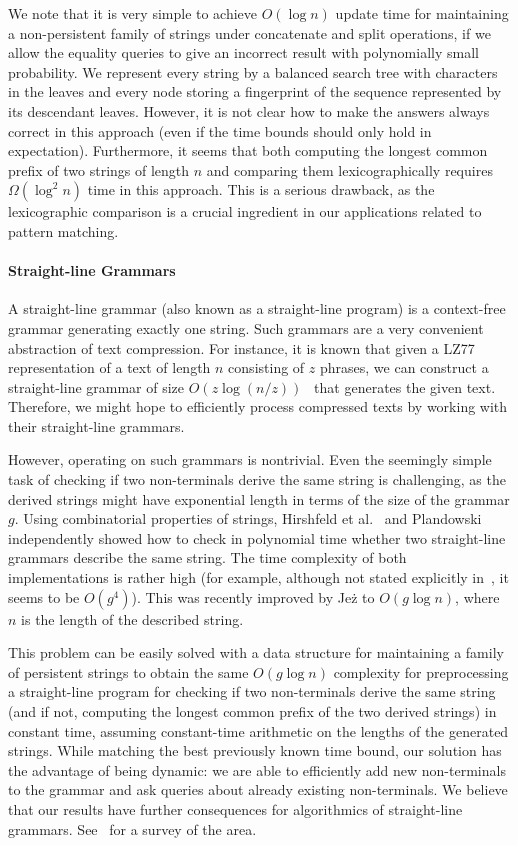 \documentclass[a4paper]{article}
\theoremstyle{remark}
\begin{document}
We note that it is very simple to achieve $O(\log n)$ update time for maintaining a non-persistent
family of strings under concatenate and split operations, if we allow the equality queries
to give an incorrect result with polynomially small probability.
We represent every string by a balanced search tree with characters in the leaves and every
node storing a fingerprint of the sequence represented by its descendant leaves. However, it is not clear how to make
the answers always correct in this approach (even if the time bounds should
only hold in expectation). Furthermore, it seems that both computing the longest common
prefix of two strings of length $n$ and comparing them lexicographically requires $\Omega(\log^2n)$ time in this approach.
This is a serious drawback, as the lexicographic comparison is a crucial ingredient in our applications related to pattern matching.

\paragraph{Straight-line Grammars}
A straight-line grammar (also known as a straight-line program) is a context-free grammar
generating exactly one string. Such grammars are a very convenient abstraction of text
compression. For instance, it is known that given a LZ77 representation of a text of length $n$
consisting of $z$ phrases, we can construct a straight-line grammar of size
$O(z\log(n/z))$~\cite{Charikar,Rytter} that generates the given text. Therefore, we might hope to efficiently process
compressed texts by working with their straight-line grammars.

However, operating on such
grammars is nontrivial. Even the seemingly simple task of checking if two non-terminals derive
the same string is challenging, as the derived strings might have exponential
length in terms of the size of the grammar $g$. Using combinatorial properties of strings,
Hirshfeld et al.~\cite{Hirshfeld} and Plandowski~\cite{Plandowski} independently showed
how to check in polynomial time whether two straight-line grammars describe the same string.
The time complexity of both implementations is rather high (for example, although not stated
explicitly in~\cite{Plandowski}, it seems to be $O(g^4)$). This was recently improved
by Jeż to $O(g\log n)$, where $n$ is the length of the described string.

This problem can be easily solved with a data structure for maintaining a family of persistent strings
to obtain the same $O(g\log n)$ complexity for 
preprocessing a straight-line program
for checking if two non-terminals derive the same string (and if not, computing the longest common prefix of the two derived strings) in constant time, assuming
constant-time arithmetic on the lengths of the generated strings.
While matching the best previously known time bound, our solution has the advantage of being dynamic:
we are able to efficiently add new non-terminals to the grammar and ask queries about
already existing non-terminals.
We believe that our results have further consequences for algorithmics of straight-line grammars.
See~\cite{LohreySurvey} for a survey of the area.
\end{document}
